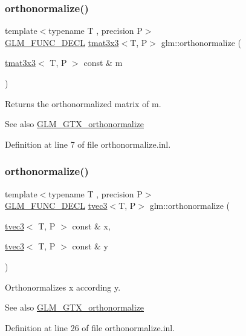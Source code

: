 \subsubsection{\texorpdfstring{orthonormalize()}{orthonormalize()}\hspace{0.1cm}{\footnotesize\ttfamily [1/2]}}
{\footnotesize\ttfamily template$<$typename T , precision P$>$ \\
\mbox{\hyperlink{setup_8hpp_ab2d052de21a70539923e9bcbf6e83a51}{G\+L\+M\+\_\+\+F\+U\+N\+C\+\_\+\+D\+E\+CL}} \mbox{\hyperlink{structglm_1_1tmat3x3}{tmat3x3}}$<$T, P$>$ glm\+::orthonormalize (\begin{DoxyParamCaption}\item[{\mbox{\hyperlink{structglm_1_1tmat3x3}{tmat3x3}}$<$ T, P $>$ const \&}]{m }\end{DoxyParamCaption})}

Returns the orthonormalized matrix of m.

\begin{DoxySeeAlso}{See also}
\mbox{\hyperlink{group__gtx__orthonormalize}{G\+L\+M\+\_\+\+G\+T\+X\+\_\+orthonormalize}} 
\end{DoxySeeAlso}


Definition at line 7 of file orthonormalize.\+inl.

\mbox{\label{group__gtx__orthonormalize_gad7afff30d7323fdc7aed7f5a16a0c596}} 
\subsubsection{\texorpdfstring{orthonormalize()}{orthonormalize()}\hspace{0.1cm}{\footnotesize\ttfamily [2/2]}}
{\footnotesize\ttfamily template$<$typename T , precision P$>$ \\
\mbox{\hyperlink{setup_8hpp_ab2d052de21a70539923e9bcbf6e83a51}{G\+L\+M\+\_\+\+F\+U\+N\+C\+\_\+\+D\+E\+CL}} \mbox{\hyperlink{structglm_1_1tvec3}{tvec3}}$<$T, P$>$ glm\+::orthonormalize (\begin{DoxyParamCaption}\item[{\mbox{\hyperlink{structglm_1_1tvec3}{tvec3}}$<$ T, P $>$ const \&}]{x,  }\item[{\mbox{\hyperlink{structglm_1_1tvec3}{tvec3}}$<$ T, P $>$ const \&}]{y }\end{DoxyParamCaption})}

Orthonormalizes x according y.

\begin{DoxySeeAlso}{See also}
\mbox{\hyperlink{group__gtx__orthonormalize}{G\+L\+M\+\_\+\+G\+T\+X\+\_\+orthonormalize}} 
\end{DoxySeeAlso}


Definition at line 26 of file orthonormalize.\+inl.

